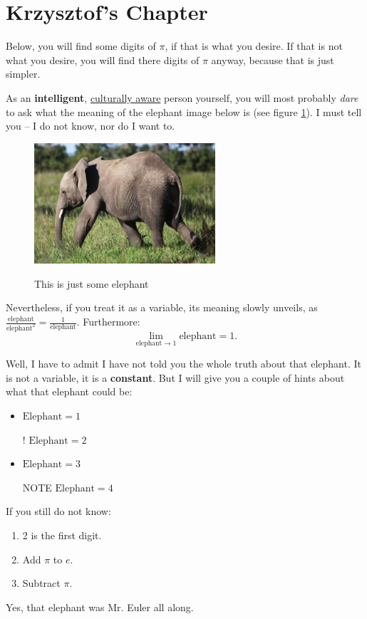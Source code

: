 \section{Krzysztof's Chapter}

Below, you will find some digits of $\pi$, if that is what you desire. If that is not what you desire, you will find there digits of $\pi$ anyway, because that is just simpler.



As an \textbf{intelligent}, \underline{culturally aware} person yourself, you will most probably \emph{dare} to ask what the meaning of the elephant image below is (see figure \ref{fig:elephant}). I must tell you -- I do not know, nor do I want to.

\begin{figure}[h!]
    \begin{center}
    \label{fig:elephant}
    \includegraphics[width=0.6\textwidth]{Pictures/elephant.jpg}
    \caption{This is just some elephant}
    \end{center}
\end{figure}

Nevertheless, if you treat it as a variable, its meaning slowly unveils, as $\frac{\text{elephant}}{\text{elephant}^2} = \frac{1}{\text{elephant}}$. Furthermore:
\begin{equation}
    \lim_{\text{elephant}\to1} {\text{elephant}} = 1.
\end{equation}

Well, I have to admit I have not told you the whole truth about that elephant. It is not a variable, it is a \textbf{constant}. But I will give you a couple of hints about what that elephant could be:
\begin{itemize}
    \item $\text{Elephant} = 1$
    \item[!] $\text{Elephant} = 2$
    \item $\text{Elephant} = 3$
    \item[NOTE] $\text{Elephant} = 4$
\end{itemize}

If you still do not know:
\begin{enumerate}
    \item 2 is the first digit.
    \item Add $\pi$ to $e$.
    \item Subtract $\pi$.
\end{enumerate}

\begin{center}
Yes, that elephant was Mr. Euler all along.
\end{center}